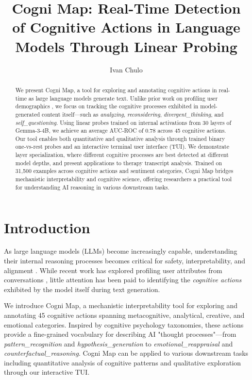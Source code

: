 \documentclass[letterpaper]{article}
\title{Cogni Map: Real-Time Detection of Cognitive Actions in Language Models Through Linear Probing}
\author{
    Ivan Chulo
}
\begin{document}
\maketitle

\begin{abstract}
We present Cogni Map, a tool for exploring and annotating cognitive actions in real-time as large language models generate text. Unlike prior work on profiling user demographics \cite{chen2024designing}, we focus on tracking the cognitive processes exhibited in model-generated content itself---such as \textit{analyzing}, \textit{reconsidering}, \textit{divergent\_thinking}, and \textit{self\_questioning}. Using linear probes trained on internal activations from 30 layers of Gemma-3-4B, we achieve an average AUC-ROC of 0.78 across 45 cognitive actions. Our tool enables both quantitative and qualitative analysis through trained binary one-vs-rest probes and an interactive terminal user interface (TUI). We demonstrate layer specialization, where different cognitive processes are best detected at different model depths, and present applications to therapy transcript analysis. Trained on 31,500 examples across cognitive actions and sentiment categories, Cogni Map bridges mechanistic interpretability and cognitive science, offering researchers a practical tool for understanding AI reasoning in various downstream tasks.
\end{abstract}

\section{Introduction}

As large language models (LLMs) become increasingly capable, understanding their internal reasoning processes becomes critical for safety, interpretability, and alignment \cite{bereska2024mechanistic}. While recent work has explored profiling user attributes from conversations \cite{chen2024designing}, little attention has been paid to identifying the \textit{cognitive actions} exhibited by the model itself during text generation.

We introduce Cogni Map, a mechanistic interpretability tool for exploring and annotating 45 cognitive actions spanning metacognitive, analytical, creative, and emotional categories. Inspired by cognitive psychology taxonomies, these actions provide a fine-grained vocabulary for describing AI "thought processes"---from \textit{pattern\_recognition} and \textit{hypothesis\_generation} to \textit{emotional\_reappraisal} and \textit{counterfactual\_reasoning}. Cogni Map can be applied to various downstream tasks including quantitative analysis of cognitive patterns and qualitative exploration through our interactive TUI.
\end{document}
